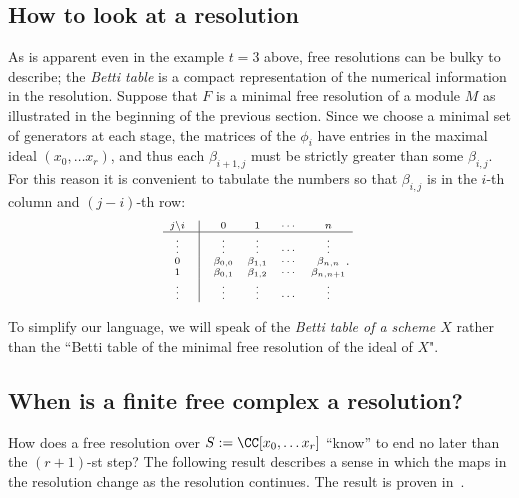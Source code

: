 \subsection{How to look at a resolution}
As is apparent even in the example $t=3$ above, free resolutions can be bulky to describe; the 
\emph{Betti table} is a compact representation of the numerical information in the resolution.
Suppose that 
$F$ is a minimal free resolution of a module $M$ as illustrated in the beginning of the previous section. Since we choose a minimal set of generators at each stage, the matrices of the $\phi_i$ have entries in the maximal
ideal $(x_0,\dots x_r)$, and thus each $\beta_{i+1, j}$ must be strictly greater than some $\beta_{i,j}$. For this reason it
is convenient to tabulate the numbers so that $\beta_{i,j}$ is in the $i$-th column and $(j-i)$-th row:
$$
\scriptsize{
\begin{matrix} 
j\backslash i&\vline&0   &  1    & \cdots & n    \cr\hline
\vdots&\vline&\vdots&\vdots & \cdots    &\vdots     \cr 
       0&\vline&\beta_{0,0}&\beta_{1,1}&\cdots&\beta_{n,n}\cr
       1&\vline&\beta_{0,1}&\beta_{1,2}&\cdots&\beta_{n,n+1}\cr
\vdots&\vline&\vdots&\vdots & \cdots    &\vdots     \cr 
\end{matrix}.
}
$$         


 To simplify our language, we will speak of the \emph{Betti table of a scheme $X$} rather than the ``Betti table of the minimal free resolution of the ideal of $X$".

\subsection{When is a finite free complex a resolution?}
How does a free resolution over $S := \CC[x_0, \dots x_r]$ ``know'' to end no later than the $(r+1)$-st step? 
The following result describes a sense in which the maps in the resolution change as the resolution continues.
The result is proven in~\cite[Theorem 20.9]{Eisenbud1995}. 

